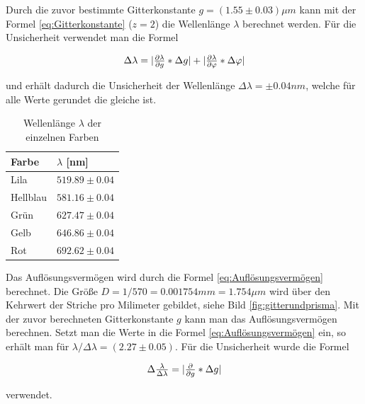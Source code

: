 \documentclass[12pt,a4paper,twoside]{article}
\begin{document}
\noindent
Durch die zuvor bestimmte Gitterkonstante $g = (1.55 \pm 0.03) \mu m$ kann mit der Formel \ref{eq:Gitterkonstante} ($z=2$) die Wellenlänge $\lambda$ berechnet werden. 
Für die Unsicherheit verwendet man die Formel

\begin{equation}
    \label{eq:uns wellenwix}
    \centerline{$ \Delta \lambda = \vert \frac{\partial \lambda}{\partial g} * \Delta g \vert + \vert \frac{\partial \lambda }{\partial \varphi} * \Delta \varphi \vert$}
\end{equation}

\noindent
und erhält dadurch die Unsicherheit der Wellenlänge $\Delta \lambda = \pm 0.04 nm$, welche für alle Werte gerundet die gleiche ist. 

\begin{table}[H]
    \centering
    \caption{Wellenlänge $\lambda$ der einzelnen Farben}
    \label{tab:wellenlänge gitter}
    \begin{tabular}{| l | l |}
        \hline
        Farbe & $\lambda$ [nm] \\
        \hline
        Lila        & $ 519.89 \pm 0.04 $ \\
        Hellblau    & $ 581.16 \pm 0.04 $ \\
        Grün        & $ 627.47 \pm 0.04 $ \\
        Gelb        & $ 646.86 \pm 0.04 $ \\
        Rot         & $ 692.62 \pm 0.04 $ \\
        \hline
    \end{tabular}
\end{table}

\noindent
Das Auflösungsvermögen wird durch die Formel \ref{eq:Auflösungsvermögen} berechnet. 
Die Größe $D = 1/570 = 0.001754 mm = 1.754 \mu m$ wird über den Kehrwert der Striche pro Milimeter gebildet, siehe Bild \ref{fig:gitterundprisma}. Mit der zuvor berechneten Gitterkonstante $g$ kann man das Auflösungsvermögen berechnen. 
Setzt man die Werte in die Formel \ref{eq:Auflösungsvermögen} ein, so erhält man für $\lambda / \Delta \lambda = (2.27 \pm 0.05)$. 
Für die Unsicherheit wurde die Formel

\begin{equation}
    \label{eq:uns Auflösungsvermögen}
    \centerline{$ \Delta \frac{\lambda}{\Delta \lambda} = \vert \frac{\partial}{\partial g} * \Delta g \vert$}
\end{equation}

\noindent
verwendet. 
\end{document}
